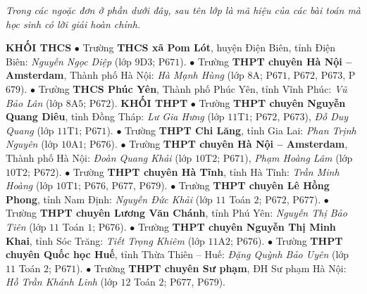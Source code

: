 \textit{Trong các ngoặc đơn ở phần dưới đây, sau tên lớp là mã hiệu của các bài toán mà học sinh có lời giải hoàn chỉnh.}
\vskip 0.05cm
\begin{multicols}{2}
	\textbf{\color{thachthuctoanhoc}KHỐI THCS}
	\vskip 0.05cm
	$\bullet$  Trường \textbf{\color{thachthuctoanhoc}THCS xã Pom Lót}, huyện Điện Biên, tỉnh Điện Biên: \textit{Nguyễn Ngọc Diệp} (lớp $9$D$3$; P$671$).
	\vskip 0.05cm
	$\bullet$  Trường \textbf{\color{thachthuctoanhoc}THPT chuyên Hà Nội -- Amsterdam}, Thành phố Hà Nội: \textit{Hà Mạnh Hùng} (lớp $8$A; P$671$, P$672$, P$673$, P$679$).
	\vskip 0.05cm
	$\bullet$  Trường \textbf{\color{thachthuctoanhoc}THCS Phúc Yên}, Thành phố Phúc Yên, tỉnh Vĩnh Phúc: \textit{Vũ Bảo Lân} (lớp $8$A$5$; P$672$).
	\vskip 0.05cm
	\textbf{\color{thachthuctoanhoc}KHỐI THPT}
	\vskip 0.05cm
	$\bullet$  Trường \textbf{\color{thachthuctoanhoc}THPT chuyên Nguyễn Quang Diêu}, tỉnh Đồng Tháp: \textit{Lư Gia Hưng} (lớp $11$T$1$; P$672$, P$673$), \textit{Đỗ Duy Quang} (lớp $11$T$1$; P$671$).
	\vskip 0.05cm
	$\bullet$  Trường \textbf{\color{thachthuctoanhoc}THPT Chi Lăng}, tỉnh Gia Lai: \textit{Phan Trịnh Nguyên} (lớp $10$A$1$; P$676$).
	\vskip 0.05cm
	$\bullet$  Trường \textbf{\color{thachthuctoanhoc}THPT chuyên Hà Nội -- Amsterdam}, Thành phố Hà Nội: \textit{Đoàn Quang Khải} (lớp $10$T$2$; P$671$), \textit{Phạm Hoàng Lâm} (lớp $10$T$2$; P$672$).
	\vskip 0.05cm
	$\bullet$  Trường \textbf{\color{thachthuctoanhoc}THPT chuyên Hà Tĩnh}, tỉnh Hà Tĩnh: \textit{Trần Minh Hoàng} (lớp $10$T$1$; P$676$, P$677$, P$679$).
	\vskip 0.05cm
	$\bullet$  Trường \textbf{\color{thachthuctoanhoc}THPT chuyên Lê Hồng Phong}, tỉnh Nam Định: \textit{Nguyễn Đức Khải} (lớp $11$ Toán $2$; P$672$, P$677$).
	\vskip 0.05cm
	$\bullet$  Trường \textbf{\color{thachthuctoanhoc}THPT chuyên Lương Văn Chánh}, tỉnh Phú Yên: \textit{Nguyễn Thị Bảo Tiên} (lớp $11$ Toán $1$; P$676$).
	\vskip 0.05cm
	$\bullet$  Trường \textbf{\color{thachthuctoanhoc}THPT chuyên Nguyễn Thị Minh Khai}, tỉnh Sóc Trăng: \textit{Tiết Trọng Khiêm} (lớp $11$A$2$; P$676$).
	\vskip 0.05cm
	$\bullet$  Trường \textbf{\color{thachthuctoanhoc}THPT chuyên Quốc học Huế}, tỉnh Thừa Thiên -- Huế: \textit{Đặng Quỳnh Bảo Uyên} (lớp $11$ Toán $2$; P$671$).
	\vskip 0.05cm
	$\bullet$  Trường \textbf{\color{thachthuctoanhoc}THPT chuyên Sư phạm}, ĐH Sư phạm Hà Nội: \textit{Hồ Trần Khánh Linh} (lớp $12$ Toán $2$; P$677$, P$679$).
\end{multicols}